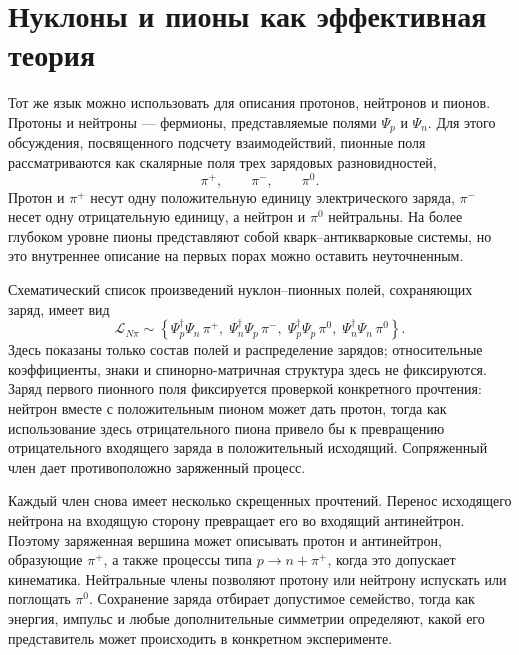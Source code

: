 \section{Нуклоны и пионы как эффективная теория}

Тот же язык можно использовать для описания протонов, нейтронов и пионов. Протоны и нейтроны — фермионы, представляемые полями \(\Psi_p\) и \(\Psi_n\). Для этого обсуждения, посвященного подсчету взаимодействий, пионные поля рассматриваются как скалярные поля трех зарядовых разновидностей,
\begin{equation}
\pi^+,
\qquad
\pi^-,
\qquad
\pi^0.
\end{equation}
Протон и \(\pi^+\) несут одну положительную единицу электрического заряда, \(\pi^-\) несет одну отрицательную единицу, а нейтрон и \(\pi^0\) нейтральны. На более глубоком уровне пионы представляют собой кварк--антикварковые системы, но это внутреннее описание на первых порах можно оставить неуточненным.

Схематический список произведений нуклон--пионных полей, сохраняющих заряд, имеет вид
\begin{equation}
\mathcal L_{N\pi}
\sim
\left\{
\Psi_p^\dagger\Psi_n\,\pi^+,\;
\Psi_n^\dagger\Psi_p\,\pi^-,\;
\Psi_p^\dagger\Psi_p\,\pi^0,\;
\Psi_n^\dagger\Psi_n\,\pi^0
\right\}.
\end{equation}
Здесь показаны только состав полей и распределение зарядов; относительные коэффициенты, знаки и спинорно-матричная структура здесь не фиксируются. Заряд первого пионного поля фиксируется проверкой конкретного прочтения: нейтрон вместе с положительным пионом может дать протон, тогда как использование здесь отрицательного пиона привело бы к превращению отрицательного входящего заряда в положительный исходящий. Сопряженный член дает противоположно заряженный процесс.

Каждый член снова имеет несколько скрещенных прочтений. Перенос исходящего нейтрона на входящую сторону превращает его во входящий антинейтрон. Поэтому заряженная вершина может описывать протон и антинейтрон, образующие \(\pi^+\), а также процессы типа \(p\to n+\pi^+\), когда это допускает кинематика. Нейтральные члены позволяют протону или нейтрону испускать или поглощать \(\pi^0\). Сохранение заряда отбирает допустимое семейство, тогда как энергия, импульс и любые дополнительные симметрии определяют, какой его представитель может происходить в конкретном эксперименте.

